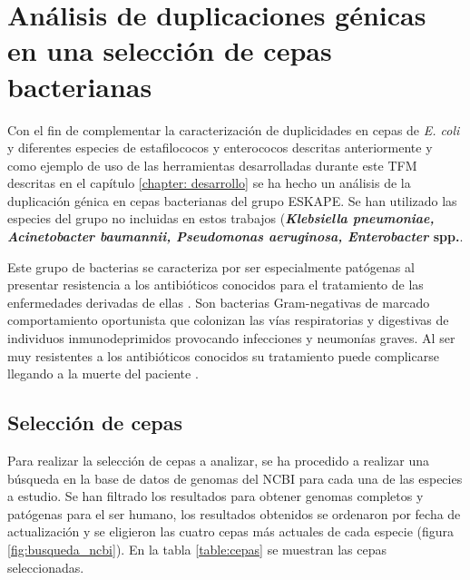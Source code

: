 \chapter{Análisis de duplicaciones génicas en una selección de cepas bacterianas}
\label{chapter: analisis}

Con el fin de complementar la caracterización de duplicidades en cepas de \textit{E. coli} y diferentes especies de estafilococos y enterococos descritas anteriormente \cite{bernabeu_gene_2019, sanchez-herrero_gene_2020} y como ejemplo de uso de las herramientas desarrolladas durante este TFM descritas en el capítulo \ref{chapter: desarrollo} se ha hecho un análisis de la duplicación génica en cepas bacterianas del grupo ESKAPE. Se han utilizado las especies del grupo no incluidas en estos trabajos (\textbf{\textit{Klebsiella pneumoniae, Acinetobacter baumannii, Pseudomonas aeruginosa, Enterobacter} spp.}.

Este grupo de bacterias se caracteriza por ser especialmente patógenas al presentar resistencia a los antibióticos conocidos para el tratamiento de las enfermedades derivadas de ellas \cite{pendleton_clinical_2013, chavez-jacobo_batalla_2020}. Son bacterias Gram-negativas de marcado comportamiento oportunista que colonizan las vías respiratorias y digestivas de individuos inmunodeprimidos provocando infecciones y neumonías graves. Al ser muy resistentes a los antibióticos conocidos su tratamiento puede complicarse llegando a la muerte del paciente \cite{toro_klebsiella_2010, farinas_infecciones_2013, todar_pseudomonas_nodate, dworkin_genus_2006}. 

\section{Selección de cepas}

Para realizar la selección de cepas a analizar, se ha procedido a realizar una búsqueda en la base de datos de genomas del NCBI \cite{noauthor_home_nodate} para cada una de las especies a estudio. Se han filtrado los resultados para obtener genomas completos y patógenas para el ser humano, los resultados obtenidos se ordenaron por fecha de actualización y se eligieron las cuatro cepas más actuales de cada especie (figura \ref{fig:busqueda_ncbi}). En la tabla \ref{table:cepas} se muestran las cepas seleccionadas.

